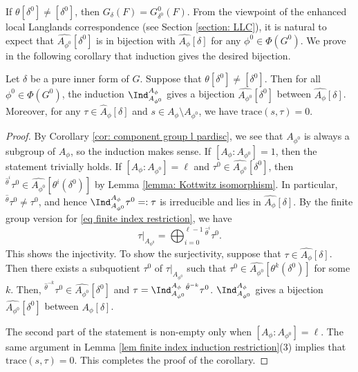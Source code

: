 \documentclass[11pt,letterpaper]{amsart}
\numberwithin{equation}{section}
\begin{document}
If $\theta[\delta^0] \neq [\delta^0]$, then $G_{\delta}(F)=G_{\delta^0}^0(F)$. From the viewpoint of the enhanced local Langlands correspondence (see Section \ref{section: LLC}), it is natural to expect that $\widehat{A_{\phi^0}}[\delta^0]$ is in bijection with $ \widehat{A_{\phi}}[\delta]$ for any $\phi^0 \in \Phi(G^0)$. We prove in the following corollary that induction gives the desired bijection.
\begin{corollary}\label{cor component group theta[delta]neq [delta]}
    Let $\delta$ be a pure inner form of $G$. Suppose that $\theta[\delta^0] \neq [\delta^0]$. Then for all $\phi^0 \in \Phi(G^0)$, the induction $\Ind_{A_{\phi^0}}^{A_{\phi}}$ gives a bijection $\widehat{A_{\phi^0}}[\delta^0]$ between $ \widehat{A_{\phi}}[\delta]$. Moreover, for any $\tau \in \widehat{A}_{\phi}[\delta]$ and $s \in A_{\phi} \setminus A_{\phi^0}$, we have $\textrm{trace}(s, \tau)=0$.
\end{corollary}
\begin{proof}
    By Corollary \ref{cor: component group  l pardisc}, we see that $A_{\phi^0}$ is always a subgroup of $A_{\phi}$, so the induction makes sense. If $[A_{\phi}:A_{\phi^0}]=1$, then the statement trivially holds. If $[A_{\phi}:A_{\phi^0}]=\ell$ and $\tau^0 \in \widehat{A_{\phi^0}}[\delta^0]$, then ${}^{\hat{\theta}^i}\tau^0 \in \widehat{A_{\phi^0}}[\theta^i(\delta^0)]$ by Lemma \ref{lemma: Kottwitz isomorphism}. In particular, ${}^{\hat{\theta}}\tau^0 \neq \tau^0$, and hence $ \Ind_{A_{\phi^0}}^{A_{\phi}} \tau^0=: \tau$ is irreducible and lies in $\widehat{A_{\phi}}[\delta]$. By the finite group version for \eqref{eq finite index restriction}, we have 
    \[ \tau|_{A_{\phi^0}}= \bigoplus_{i=0}^{\ell-1} {}^{\hat{\theta}^i}\tau^0. \]
    This shows the injectivity.   
    To show the surjectivity, suppose that $\tau \in \widehat{A_{\phi}}[\delta]$. Then there exists a subquotient $\tau^0$ of $ \tau|_{A_{\phi^0}}$ such that $\tau^0 \in \widehat{A_{\phi^0}}[ \theta^k (\delta^0)]$ for some $k$. Then, ${}^{\hat{\theta}^{-k}}\tau^0 \in \widehat{A_{\phi^0}}[\delta^0]$ and $\tau= \Ind_{A_{\phi^0}}^{A_{\phi}} {}^{\hat{\theta}^{-k}}\tau^0$. $\Ind_{A_{\phi^0}}^{A_{\phi}}$ gives a bijection $\widehat{A_{\phi^0}}[\delta^0]$ between $ \widehat{A_{\phi}}[\delta]$.

    The second part of the statement is non-empty only when $[A_{\phi}: A_{\phi^0}]= \ell$. The same argument in Lemma \ref{lem finite index induction restriction}(3) implies that $\textrm{trace}(s, \tau)=0$.
    This completes the proof of the corollary.
\end{proof}
\end{document}
